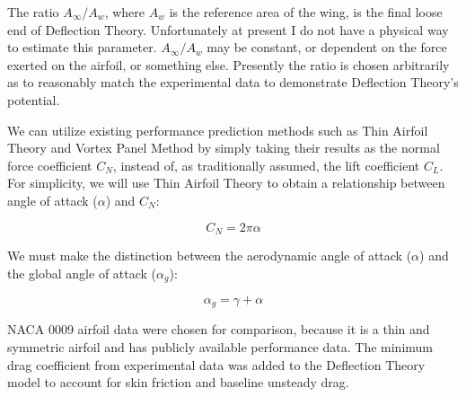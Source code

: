 The ratio \(A_\infty / A_w\), where \(A_w\) is the reference area of the wing, is the final loose end of Deflection Theory. Unfortunately at present I do not have a physical way to estimate this parameter.
\(A_\infty / A_w\) may be constant, or dependent on the force exerted on the airfoil, or something else.
Presently the ratio is chosen arbitrarily as to reasonably match the experimental data to demonstrate Deflection Theory's potential.

We can utilize existing performance prediction methods such as Thin Airfoil Theory and Vortex Panel Method by simply taking their results as the normal force coefficient \(C_N\), instead of, as traditionally assumed, the lift coefficient \(C_L\). For simplicity, we will use Thin Airfoil Theory to obtain a relationship between angle of attack (\(\alpha\)) and \(C_N\):

\begin{equation}
    C_N = 2 \pi \alpha
\end{equation}

We must make the distinction between the aerodynamic angle of attack (\(\alpha\)) and the global angle of attack (\(\alpha_g\)):

\begin{equation}
    \alpha_g = \gamma + \alpha
\end{equation}

NACA 0009 airfoil data were chosen for comparison, because it is a thin and symmetric airfoil and has publicly available performance data. The minimum drag coefficient from experimental data was added to the Deflection Theory model to account for skin friction and baseline unsteady drag.

